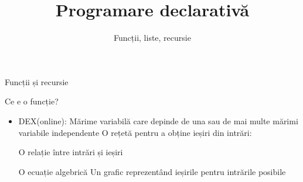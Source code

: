 \documentclass[xcolor=pdftex,romanian,colorlinks]{beamer}
\title[PD---Baze]{Programare declarativă}
\subtitle{Funcții, liste, recursie}
\begin{document}
\begin{frame}
  \titlepage
\end{frame}

\begin{section}{Funcții și recursie}
\begin{frame}{Ce e o funcție?}
\begin{itemize}
\item DEX(online): Mărime variabilă care depinde de una sau de mai multe mărimi variabile independente
\vitem O rețetă pentru a obține ieșiri din intrări: 
\hfill {}

\vitem O relație între intrări și ieșiri
      \hfill {} 
      
\vitem O ecuație algebrică \hfill {}
\vitem Un grafic reprezentând ieșirile pentru intrările posibile
 \pgfplotsset{height=5cm}
\end{itemize}
\end{frame}


\end{section}
\end{document}
